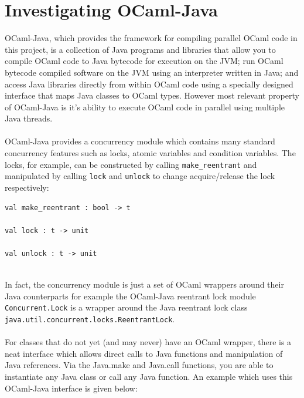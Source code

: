 \documentclass[12pt,twoside,notitlepage]{report}
\begin{document}
\section{Investigating OCaml-Java}
\label{sec:investigating_ocaml-java}
%
%
OCaml-Java, which provides the framework for compiling parallel OCaml code in this project, is a collection of Java programs and libraries that allow you to compile OCaml code to Java bytecode for execution on the JVM; run OCaml
bytecode compiled software on the JVM using an interpreter written in Java; and access Java libraries directly from within OCaml code using a specially designed interface that maps Java classes to OCaml types. However most relevant
property of OCaml-Java is it's ability to execute OCaml code in parallel using multiple Java threads.
\hfill\\
\hfill\\
%
%
OCaml-Java provides a concurrency module which contains many standard concurrency features such as locks, atomic variables and condition variables. The locks, for example, can be constructed by calling {\tt make\_reentrant} and
manipulated by calling {\tt lock} and {\tt unlock} to change acquire/release the lock respectively:
\hfill\\
\begin{lstlisting}
val make_reentrant : bool -> t

val lock : t -> unit

val unlock : t -> unit
\end{lstlisting}
\hfill\\
In fact, the concurrency module is just a set of OCaml wrappers around their Java counterparts\cite{web:clerc2013} for example the OCaml-Java reentrant lock module {\tt Concurrent.Lock} is a wrapper around the Java reentrant lock
class {\tt java.util.concurrent.locks.ReentrantLock}.
\hfill\\
\hfill\\
%
%
For classes that do not yet (and may never) have an OCaml wrapper, there is a neat interface which allows direct calls to Java functions and manipulation of Java references. Via the Java.make and Java.call functions,
you are able to instantiate any Java class or call any Java function. An example which uses this OCaml-Java interface is given below:
\end{document}
